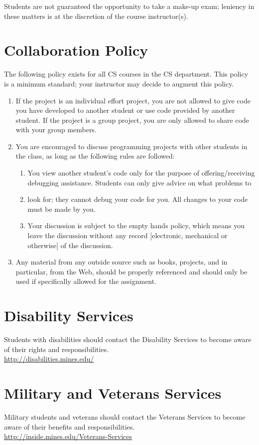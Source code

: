 \documentclass[12pt]{article}
\begin{document}
Students are not guaranteed the opportunity to take a make-up exam; leniency in these matters is at the discretion of the course instructor(s).
\section{Collaboration Policy}
The following policy exists for all CS courses in the CS department. This policy is a minimum standard; your instructor may decide to augment this
policy.

\begin{enumerate}
  \item If the project is an individual effort project, you are not allowed to give code you have developed to another student or use code provided by another
    student. If the project is a group project, you are only allowed to share code with your group members.
  \item You are encouraged to discuss programming projects with other students in the class, as long as the following rules are followed:
    \begin{enumerate}
      \item You view another student's code only for the purpose of offering/receiving debugging assistance. Students can only give advice on what problems to
      \item look for; they cannot debug your code for you. All changes to your code must be made by you.
      \item Your discussion is subject to the empty hands policy, which means you leave the discussion without any record [electronic, mechanical or otherwise] of
        the discussion.
    \end{enumerate}
  \item Any material from any outside source such as books, projects, and in particular, from the Web, should be properly referenced and should only be used
    if specifically allowed for the assignment.
\end{enumerate}

\section{Disability Services}
Students with disabilities should contact the Disability Services to become aware of their rights and responsibilities. \\
\href{http://disabilities.mines.edu/}{http://disabilities.mines.edu/}
\section{Military and Veterans Services}
Military students and veterans should contact the Veterans Services to become aware of their benefits and responsibilities. \\
\href{http://inside.mines.edu/Veterans-Services}{http://inside.mines.edu/Veterans-Services}
\end{document}
